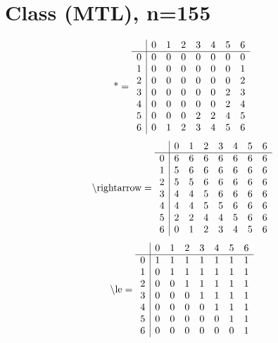 \documentclass[11pt]{article}
\begin{document}
\section{Class (MTL), n=155}
\[\text{*} = 
\begin{array}{r | r r r r r r r}
 & 0 & 1 & 2 & 3 & 4 & 5 & 6 \\ \hline
0 & 0 & 0 & 0 & 0 & 0 & 0 & 0 \\
1 & 0 & 0 & 0 & 0 & 0 & 0 & 1 \\
2 & 0 & 0 & 0 & 0 & 0 & 0 & 2 \\
3 & 0 & 0 & 0 & 0 & 0 & 2 & 3 \\
4 & 0 & 0 & 0 & 0 & 0 & 2 & 4 \\
5 & 0 & 0 & 0 & 2 & 2 & 4 & 5 \\
6 & 0 & 1 & 2 & 3 & 4 & 5 & 6 \\
\end{array}
\]
\[\text{\textbackslash rightarrow} = 
\begin{array}{r | r r r r r r r}
 & 0 & 1 & 2 & 3 & 4 & 5 & 6 \\ \hline
0 & 6 & 6 & 6 & 6 & 6 & 6 & 6 \\
1 & 5 & 6 & 6 & 6 & 6 & 6 & 6 \\
2 & 5 & 5 & 6 & 6 & 6 & 6 & 6 \\
3 & 4 & 4 & 5 & 6 & 6 & 6 & 6 \\
4 & 4 & 4 & 5 & 5 & 6 & 6 & 6 \\
5 & 2 & 2 & 4 & 4 & 5 & 6 & 6 \\
6 & 0 & 1 & 2 & 3 & 4 & 5 & 6 \\
\end{array}
\]
\[\text{\textbackslash le} = 
\begin{array}{r | r r r r r r r}
 & 0 & 1 & 2 & 3 & 4 & 5 & 6 \\ \hline
0 & 1 & 1 & 1 & 1 & 1 & 1 & 1 \\
1 & 0 & 1 & 1 & 1 & 1 & 1 & 1 \\
2 & 0 & 0 & 1 & 1 & 1 & 1 & 1 \\
3 & 0 & 0 & 0 & 1 & 1 & 1 & 1 \\
4 & 0 & 0 & 0 & 0 & 1 & 1 & 1 \\
5 & 0 & 0 & 0 & 0 & 0 & 1 & 1 \\
6 & 0 & 0 & 0 & 0 & 0 & 0 & 1 \\
\end{array}
\]
\end{document}
